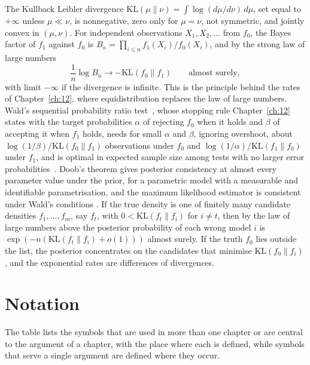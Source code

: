 The Kullback Leibler divergence \cite{kullbackleibler1951} $\mathrm{KL}(\mu\|\nu)=\int\log(d\mu/d\nu)\,d\mu$, set equal to $+\infty$ unless $\mu\ll\nu$, is nonnegative, zero only for $\mu=\nu$, not symmetric, and jointly convex in $(\mu,\nu)$. For independent observations $X_1,X_2,\dots$ from $f_0$, the Bayes factor of $f_1$ against $f_0$ \cite{kassraftery1995} is $B_n=\prod_{i\le n}f_1(X_i)/f_0(X_i)$, and by the strong law of large numbers
\[
\frac1n\log B_n\to-\mathrm{KL}(f_0\|f_1)\qquad\text{almost surely},
\]
with limit $-\infty$ if the divergence is infinite. This is the principle behind the rates of Chapter~\ref{ch:12}, where equidistribution replaces the law of large numbers. Wald's sequential probability ratio test~\cite{wald1947}, whose stopping rule Chapter~\ref{ch:12} states with the target probabilities $\alpha$ of rejecting $f_0$ when it holds and $\beta$ of accepting it when $f_1$ holds, needs for small $\alpha$ and $\beta$, ignoring overshoot, about $\log(1/\beta)/\mathrm{KL}(f_0\|f_1)$ observations under $f_0$ and $\log(1/\alpha)/\mathrm{KL}(f_1\|f_0)$ under $f_1$, and is optimal in expected sample size among tests with no larger error probabilities~\cite{waldwolfowitz1948}. Doob's theorem \cite{doob1949} gives posterior consistency at almost every parameter value under the prior, for a parametric model with a measurable and identifiable parametrisation, and the maximum likelihood estimator is consistent under Wald's conditions \cite{wald1949}. If the true density is one of finitely many candidate densities $f_1,\dots,f_m$, say $f_t$, with $0<\mathrm{KL}(f_t\|f_i)$ for $i\ne t$, then by the law of large numbers above the posterior probability of each wrong model $i$ is $\exp(-n(\mathrm{KL}(f_t\|f_i)+o(1)))$ almost surely. If the truth $f_0$ lies outside the list, the posterior concentrates on the candidates that minimise $\mathrm{KL}(f_0\|f_i)$ \cite{berk1966}, and the exponential rates are differences of divergences.

\section{Notation}\label{sec:Anotation}

The table lists the symbols that are used in more than one chapter or are central to the argument of a chapter, with the place where each is defined, while symbols that serve a single argument are defined where they occur.

